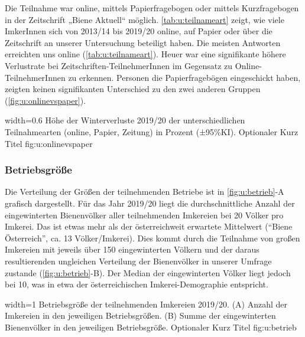 Die Teilnahme war online, mittels Papierfragebogen oder mittels Kurzfragebogen in der Zeitschrift „Biene Aktuell`` möglich. \cref{tab:u:teilnameart} zeigt, wie viele ImkerInnen sich von 2013/14 bis 2019/20 online, auf Papier oder über die Zeitschrift an unserer Untersuchung beteiligt haben. Die meisten Antworten erreichten uns online (\cref{tab:u:teilnameart}). Heuer war eine signifikante höhere Verlustrate bei Zeitschriften-TeilnehmerInnen  im Gegensatz zu Online-TeilnehmerInnen  zu erkennen. Personen die Papierfragebögen eingeschickt haben, zeigten keinen signifikanten Unterschied zu den zwei anderen Gruppen  (\cref{fig:u:onlinevspaper}). 

  {width=0.6\textwidth} %
  {Höhe der Winterverluste 2019/20 der unterschiedlichen Teilnahmearten (online, Papier, Zeitung) in Prozent (±95\%KI).} %
  {Optionaler Kurz Titel} %
  {fig:u:onlinevspaper} %



\subsubsection{Betriebsgröße}

Die Verteilung der Größen der teilnehmenden Betriebe ist in \cref{fig:u:betrieb}-A grafisch dargestellt. Für das Jahr 2019/20 liegt die durchschnittliche Anzahl der eingewinterten Bienenvölker aller teilnehmenden Imkereien bei 20 Völker pro Imkerei. Das ist etwas mehr als der österreichweit erwartete Mittelwert (\enquote{Biene Österreich}, ca. 13 Völker/Imkerei). Dies kommt durch die Teilnahme von großen Imkereien mit jeweils über 150 eingewinterten Völkern und der daraus resultierenden ungleichen Verteilung der Bienenvölker in unserer Umfrage zustande (\cref{fig:u:betrieb}-B). Der Median der eingewinterten Völker liegt jedoch bei 10, was in etwa der österreichischen Imkerei-Demographie entspricht. 

  {width=1\textwidth} %
  {Betriebsgröße der teilnehmenden Imkereien 2019/20. (A) Anzahl der Imkereien in den jeweiligen Betriebsgrößen. (B) Summe der eingewinterten Bienenvölker in den jeweiligen Betriebsgröße.} %
  {Optionaler Kurz Titel} %
  {fig:u:betrieb} %

